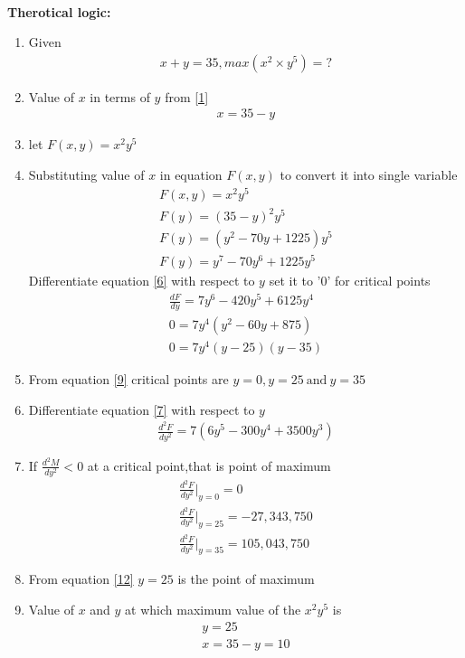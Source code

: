 \documentclass[journal]{IEEEtran}
\begin{document}
\solution\\
\textbf{Therotical logic:}
\begin{enumerate}
    \item Given
    \begin{align}
        x+y=35 , max(x^2\times y^5)=? \label{1}
    \end{align}
    \item Value of $x$ in terms of $y$ from  \eqref{1}
    \begin{align}
        x=35-y \label{2}
    \end{align}
    \item let $F(x,y)=x^2y^5$
    \item Substituting value of $x$ in equation $F(x,y)$ to convert it into single variable
    \begin{align}
        F(x,y)=x^2y^5 \label{3} \\
        F(y)=(35-y)^2y^5 \label{4} \\
        F(y)=(y^2-70y+1225)y^5 \label{5} \\
        F(y)=y^7-70y^6+1225y^5 \label{6}
    \end{align}
    Differentiate equation \eqref{6} with respect to $y$  set it to '0' for critical points
    \begin{align}
        \frac{dF}{dy}=7y^6-420y^5+6125y^4 \label{7} \\
        0=7y^4(y^2-60y+875) \label{8} \\
        0=7y^4(y-25)(y-35) \label{9}
    \end{align}
    \item From equation \eqref{9} critical points are $y=0,y=25\ \text{and}\  y=35$
    \item Differentiate equation \eqref{7} with respect to $y$ 
    \begin{align}
        \frac{d^2F}{dy^2}=7(6y^5-300y^4+3500y^3) \label{10}
    \end{align}
    \item If $\frac{d^2M}{dy^2}<0$ at a critical point,that is point of maximum 
    \begin{align}
        \frac{d^2F}{dy^2} \bigg|_{y=0} = 0 \label{11} \\
        \frac{d^2F}{dy^2} \bigg|_{y=25} =-27,343,750  \label{12} \\
        \frac{d^2F}{dy^2} \bigg|_{y=35} =105,043,750 \label{13}
    \end{align}
    \item From equation \eqref{12} $y=25$ is the point of maximum
    \item Value of $x$ and $y$ at which maximum value of the $x^2y^5$ is 
    \begin{align}
        y=25 \label{14} \\
        x=35-y=10 \label{15}
    \end{align}
\end{enumerate}
\end{document}
